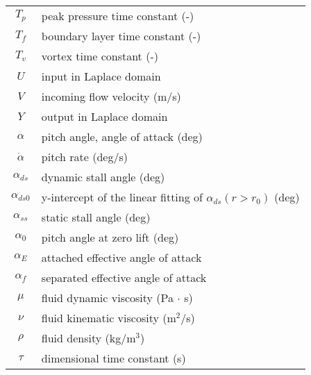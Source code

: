 \begin{tabular}{c|l}
$T_p$ & peak pressure time constant (-) \\
$T_f$ & boundary layer time constant (-) \\
$T_v$ & vortex time constant (-) \\
$U$ & input in Laplace domain \\
$V$ & incoming flow velocity (m/s) \\
$Y$ & output in Laplace domain \\ 
$\alpha$     &  pitch angle, angle of attack (deg)\\
$\dot{\alpha}$  &  pitch rate (deg/s) \\
$\alpha_{ds}$ & dynamic stall angle (deg) \\
$\alpha_{ds0}$ & y-intercept of the linear fitting of $\alpha_{ds}(r>r_0)$ (deg) \\
$\alpha_ {ss}$ & static stall angle (deg) \\ 
$\alpha_0$ & pitch angle at zero lift (deg) \\
$\alpha_E$ & attached effective angle of attack \\
$\alpha_f$ & separated effective angle of attack \\
$\mu$ & fluid dynamic viscosity (Pa $\cdot$ s) \\
$\nu$ & fluid kinematic viscosity (m$^2$/s) \\
$\rho$ & fluid density (kg/m$^3$) \\
$\tau$ & dimensional time constant (s) \\
\end{tabular}